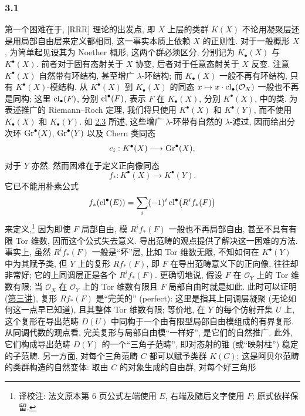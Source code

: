 \subsubsection*{3.1}
第一个困难在于, [RRR] 理论的出发点, 即 $X$ 上层的类群 $K(X)$ 不论用凝聚层还是用局部自由层来定义都相同, 这一事实本质上依赖 $X$ 的正则性. 对于一般概形 $X$, 为简单起见设其为 Noether 概形, 这两个群必须区分, 分别记为 $K_\bullet(X)$ 与 $K^\bullet(X)$. 前者对于固有态射关于 $X$ 协变, 后者对于任意态射关于 $X$ 反变. 注意 $K^\bullet(X)$ 自然带有环结构, 甚至增广 $\lambda$-环结构; 而 $K_\bullet(X)$ 一般不再有环结构, 只有 $K^\bullet(X)$-模结构. 从 $K^\bullet(X)$ 到 $K_\bullet(X)$ 的同态 $x\mapsto x\cdot\operatorname{cl}_\bullet(\mathcal O_X)$ 一般也不再是同构; 这里 $\operatorname{cl}_\bullet(F)$, 分别 $\operatorname{cl}^\bullet(F)$, 表示 $F$ 在 $K_\bullet(X)$, 分别 $K^\bullet(X)$, 中的类. 为表述推广的 Riemann--Roch 定理, 我们将只使用 $K^\bullet(X)$ 和 $K^\bullet(Y)$, 而不使用 $K_\bullet(X)$ 和 $K_\bullet(Y)$. 如 \hyperlink{sga6.e00.sec.2.3}{2.3} 所述, 这些增广 $\lambda$-环带有自然的 $\lambda$-滤过, 因而给出分次环 $\operatorname{Gr}^\bullet(X)$, $\operatorname{Gr}^\bullet(Y)$ 以及 Chern 类同态
\[
c_i:K^\bullet(X)\longrightarrow \operatorname{Gr}^\bullet(X),
\]
对于 $Y$ 亦然. 然而困难在于定义正向像同态
\begin{equation}\tag{3.1}
f_*:K^\bullet(X)\longrightarrow K^\bullet(Y).
\end{equation}
它已不能用朴素公式
\[
f_*(\operatorname{cl}^\bullet(E))=\sum_i(-1)^i\operatorname{cl}^\bullet\bigl(R^if_*(F)\bigr)
\]
来定义,\footnote{译校注: 法文原本第 6 页公式左端使用 $E$, 右端及随后文字使用 $F$; 原式依样保留.} 因为即使 $F$ 局部自由, 模 $R^if_*(F)$ 一般也不再局部自由, 甚至不具有有限 Tor 维数, 因而这个公式失去意义. 导出范畴的观点提供了解决这一困难的方法. 事实上, 虽然 $R^if_*(F)$ 一般是“坏”层, 比如 Tor 维数无限, 不知如何在 $K^\bullet(Y)$ 中为其赋予类, 但 $Y$ 上的复形 $Rf_*(F)$, 即 $F$ 在导出范畴意义下的正向像, 往往却非常好; 它的上同调层正是各个 $R^if_*(F)$. 更确切地说, 假设 $F$ 在 $\mathcal O_Y$ 上的 Tor 维数有限; 当 $\mathcal O_X$ 在 $\mathcal O_Y$ 上的 Tor 维数有限且 $F$ 局部自由时就是如此. 此时可以证明 (\hyperlink{sga6.e03.expose}{第三讲}), 复形 $Rf_*(F)$ 是“完美的” (perfect): 这里是指其上同调层凝聚 (无论如何这一点早已知道), 且其整体 Tor 维数有限; 等价地, 在 $Y$ 的每个仿射开集 $U$ 上, 这个复形在导出范畴 $D(U)$ 中同构于一个由有限型局部自由模组成的有界复形. 从同调代数的观点看, 完美复形与局部自由模“一样好”, 是它们的自然推广. 此外, 它们构成导出范畴 $D(Y)$ 的一个“三角子范畴”, 即对态射的锥 (或“映射柱”) 稳定的子范畴. 另一方面, 对每个三角范畴 $C$ 都可以赋予类群 $K(C)$; 这是阿贝尔范畴的类群构造的自然变体: 取由 $C$ 的对象生成的自由群, 对每个好三角形
